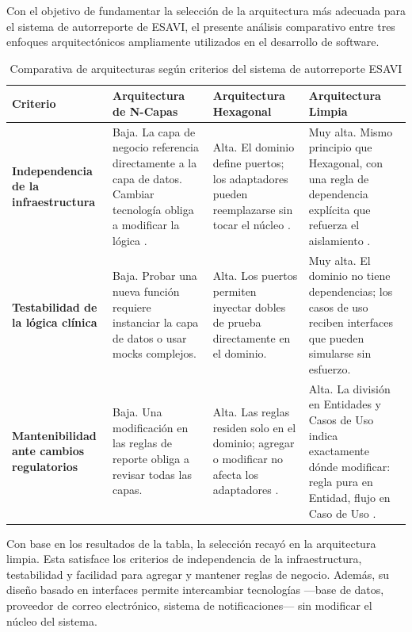 Con el objetivo de fundamentar la selección de la arquitectura más adecuada para el sistema de autorreporte de ESAVI, el presente análisis comparativo entre tres enfoques arquitectónicos ampliamente utilizados en el desarrollo de software.

\begin{table}[H]
\centering
\caption{Comparativa de arquitecturas según criterios del sistema de autorreporte ESAVI}
\label{tab:comparativa_esavi}
\begin{tabular}{|p{3.8cm}|p{3.8cm}|p{3.8cm}|p{3.8cm}|}
\hline
\textbf{Criterio} & \textbf{Arquitectura de N-Capas} & \textbf{Arquitectura Hexagonal} & \textbf{Arquitectura Limpia} \\
\hline
\textbf{Independencia de la infraestructura} & 
Baja. La capa de negocio referencia directamente a la capa de datos. Cambiar tecnología obliga a modificar la lógica \cite{microsoft_arch}. & 
Alta. El dominio define puertos; los adaptadores pueden reemplazarse sin tocar el núcleo \cite{cockburn2005}. & 
Muy alta. Mismo principio que Hexagonal, con una regla de dependencia explícita que refuerza el aislamiento \cite{martin2018}. \\
\hline
\textbf{Testabilidad de la lógica clínica} & 
Baja. Probar una nueva función requiere instanciar la capa de datos o usar mocks complejos. & 
Alta. Los puertos permiten inyectar dobles de prueba directamente en el dominio. & 
Muy alta. El dominio no tiene dependencias; los casos de uso reciben interfaces que pueden simularse sin esfuerzo. \\
\hline
\textbf{Mantenibilidad ante cambios regulatorios} & 
Baja. Una modificación en las reglas de reporte obliga a revisar todas las capas. & 
Alta. Las reglas residen solo en el dominio; agregar o modificar no afecta los adaptadores \cite{cockburn2005}. & 
Alta. La división en Entidades y Casos de Uso indica exactamente dónde modificar: regla pura en Entidad, flujo en Caso de Uso \cite{martin2018}.\\
\hline
\end{tabular}
\end{table}

Con base en los resultados de la tabla, la selección recayó en la arquitectura limpia. 
Esta satisface los criterios de independencia de la infraestructura, testabilidad y facilidad para agregar y mantener reglas de negocio. Además, su diseño basado en interfaces permite intercambiar tecnologías —base de datos, proveedor de correo electrónico, sistema de notificaciones— sin modificar el núcleo del sistema. 

